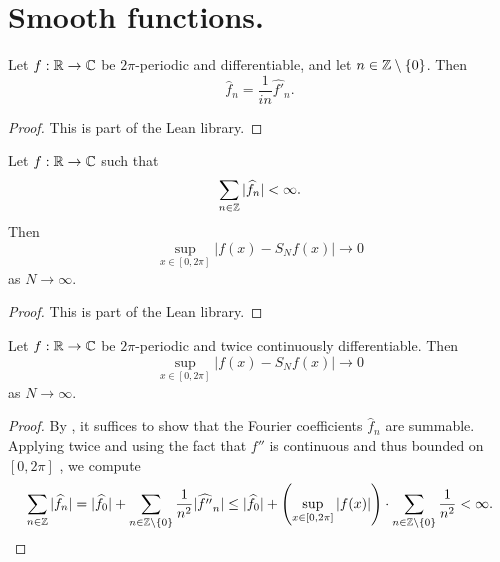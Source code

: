 \section{Smooth functions.}
\label{10smooth}
\begin{lemma}
\label{fourier-coeff-derivative}
\leanok
Let $f:{\mathbb{R}} \to {\mathbb{C}}$ be $2\pi$-periodic and differentiable, and let $n \in {\mathbb{Z}} \setminus \{0\}$. Then
\begin{equation}
    \widehat{f}_n = \frac{1}{i n} \widehat{f'}_n.
\end{equation}
\end{lemma}
\begin{proof}
\leanok
This is part of the Lean library.
\end{proof}

\begin{lemma}
\label{convergence-of-coeffs-summable}
\leanok
{}
Let $f:{\mathbb{R}} \to {\mathbb{C}}$ such that
\begin{equation}
    \sum_{n\in {\mathbb{Z}}} |\widehat{f}_n| < \infty.
\end{equation}
Then
\begin{equation}
    \sup_{x\in [0,2\pi]} |f(x) - S_Nf(x)| \rightarrow 0
\end{equation}
as $N \rightarrow \infty$.
\end{lemma}

\begin{proof}
\leanok
    This is part of the Lean library.
\end{proof}

\begin{lemma}
\label{convergence-for-twice-contdiff}
\leanok
{}
    Let $f:{\mathbb{R}} \to {\mathbb{C}}$ be $2\pi$-periodic and twice continuously differentiable. Then
    \begin{equation}
        \sup_{x\in [0,2\pi]} |f(x) - S_Nf(x)| \rightarrow 0
    \end{equation}
    as $N \rightarrow \infty$.
\end{lemma}
\begin{proof}
\leanok
By , it suffices to show that the Fourier coefficients $\widehat{f}_n$ are summable.
Applying  twice and using the fact that $f''$ is continuous and thus bounded on $[0,2\pi]$ , we compute
\begin{equation*}
    \sum_{n\in {\mathbb{Z}}} |\widehat{f}_n| = |\widehat{f}_0| + \sum_{n\in {\mathbb{Z}} \setminus \{0\}} \frac {1}{n^2} |\widehat{f''}_n|
    \le |\widehat{f}_0| + \left(\sup_{x\in [0,2\pi]} |f(x)| \right) \cdot \sum_{n\in {\mathbb{Z}} \setminus \{0\}} \frac {1}{n^2}
    < \infty.
\end{equation*}
\end{proof}

